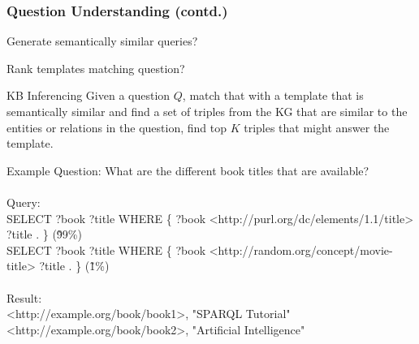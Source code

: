 \documentclass[t]{beamer}
\begin{document}
\begin{frame}
    \frametitle{Question Understanding (contd.)}
    \begin{itemize}
    \small{\item Generate semantically similar queries?
    \item Rank templates matching question?}
    \end{itemize}
    \begin{block}{KB Inferencing}
        Given a question $Q$, match that with a template that is semantically similar and find a set of triples from the KG that are similar to the entities or relations in the question, find top $K$ triples that might answer the template.
    \end{block}
    
    \begin{block}{Example}
        \tiny Question: What are the different book titles that are available?\\~\\
        Query:\\
        {\tiny SELECT ?book ?title
WHERE
\{
  ?book <http://purl.org/dc/elements/1.1/title> ?title .
\}} (\~99\%)\\
{\tiny SELECT ?book ?title
WHERE
\{
  ?book <http://random.org/concept/movie-title> ?title .
\}} (\~1\%)\\~\\
        Result:\\
        {\tiny <http://example.org/book/book1>, "SPARQL Tutorial"\\
        <http://example.org/book/book2>, "Artificial Intelligence"}
    \end{block}
\end{frame}
\end{document}
